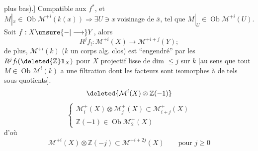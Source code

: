 plus bas).]
Compatible aux
$f^*$, et 
\[
M|_x\in\operatorname{Ob}\mathcal{M}^{+i}(k(x))
\Longrightarrow
\exists U\ni x\ \text{voisinage de $\bar{x}$, tel que }
M|_U\in\operatorname{Ob}\mathcal{M}^{+i}(U).
\]
Soit $f:X\unsure{-|\longrightarrow}Y$,
alors
\[
R^jf_!:\mathcal{M}^{+i}(X)\longrightarrow \mathcal{M}^{+i+j}(Y);
\]
de plus, $\mathcal{M}^{+i}(k)$ ($k$ un corps alg. clos)
est ``engendré'' par les 
$R^jf_!(\deleted{\mathbb{Z}}\mathbf1_X)$ pour
$X$  projectif lisse de dim $\leq j$ sur $k$
[au sens que tout $M\in\operatorname{Ob}\mathcal{M}^i(k)$ a une
filtration dont les facteurs sont isomorphes
à de tels sous-quotients].
\[
\deleted{\mathcal{M}^i(X)\otimes\mathbb{Z}(-1)}
\]
\[
\left\{
\begin{array}{l}
\mathcal{M}_i^+(X)\otimes \mathcal{M}_j^+(X)\subset \mathcal{M}_{i+j}^+(X)\\
\mathbb{Z}(-1)\in\operatorname{Ob}\mathcal{M}_2^+(X)
\end{array}\right.
\]
d'où
\[
\mathcal{M}^{+i}(X)\otimes\mathbb{Z}(-j)\subset \mathcal{M}^{+i+2j}(X)
\qquad\text{pour }j\geq0
\]
